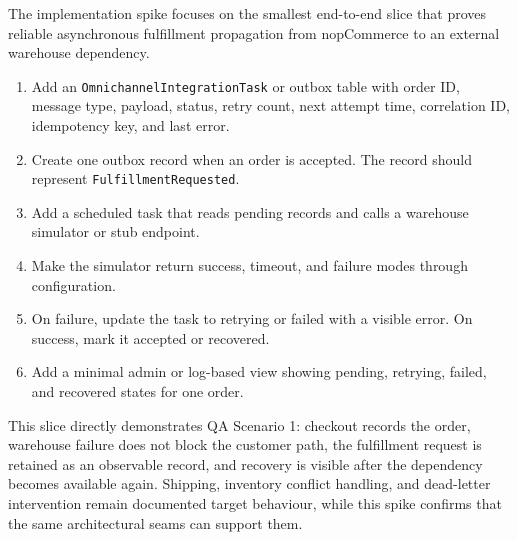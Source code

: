 The implementation spike focuses on the smallest end-to-end slice that proves reliable asynchronous fulfillment propagation from nopCommerce to an external warehouse dependency.

\begin{enumerate}
    \item Add an \texttt{OmnichannelIntegrationTask} or outbox table with order ID, message
    type, payload, status, retry count, next attempt time, correlation ID, idempotency key,
    and last error.
    \item Create one outbox record when an order is accepted. The record should represent
    \texttt{FulfillmentRequested}.
    \item Add a scheduled task that reads pending records and calls a warehouse simulator or
    stub endpoint.
    \item Make the simulator return success, timeout, and failure modes through configuration.
    \item On failure, update the task to retrying or failed with a visible error. On success,
    mark it accepted or recovered.
    \item Add a minimal admin or log-based view showing pending, retrying, failed, and
    recovered states for one order.
\end{enumerate}

This slice directly demonstrates QA Scenario 1: checkout records the order, warehouse failure
does not block the customer path, the fulfillment request is retained as an observable record,
and recovery is visible after the dependency becomes available again. Shipping, inventory
conflict handling, and dead-letter intervention remain documented target behaviour, while this
spike confirms that the same architectural seams can support them.
